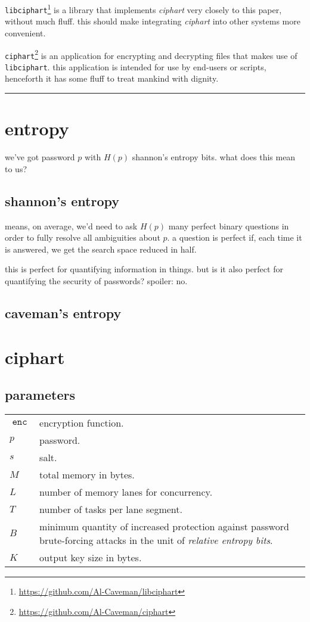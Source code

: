 \documentclass[twocolumn]{article}
\DeclareMathOperator{\enc}{\mathtt{enc}}
\begin{document}
\texttt{libciphart}\footnote{\url{https://github.com/Al-Caveman/libciphart}}
is a library that implements \emph{ciphart} very closely to this paper,
without much fluff.  this should make integrating \emph{ciphart} into other
systems more convenient.

\texttt{ciphart}\footnote{\url{https://github.com/Al-Caveman/ciphart}} is
an application for encrypting and decrypting files that makes use of
\texttt{libciphart}.  this application is intended for use by end-users or
scripts, henceforth it has some fluff to treat mankind with dignity.

\tableofcontents
\noindent
\rule{1\columnwidth}{2pt}

\section{entropy}
we've got password $p$ with $H(p)$ shannon's entropy bits.  what does this
mean to us?

\subsection{shannon's entropy}
means, on average, we'd need to ask $H(p)$ many perfect binary questions in
order to fully resolve all ambiguities about $p$.  a question is perfect
if, each time it is answered, we get the search space reduced in half.

this is perfect for quantifying information in things.  but is it also
perfect for quantifying the security of passwords?  spoiler:  no.

\subsection{caveman's entropy}

\section{ciphart}
\subsection{parameters}
\begin{tabularx}{\columnwidth}{lX}
    $\enc$ & encryption function.\\
    $p$ & password.\\
    $s$ & salt.\\
    $M$ & total memory in bytes.\\
    $L$ & number of memory lanes for concurrency.\\
    $T$ & number of tasks per lane segment.\\
    $B$ & minimum quantity of increased protection against password
            brute-forcing attacks in the unit of \emph{relative entropy
            bits}.\\
    $K$ & output key size in bytes.\\
\end{tabularx}
\end{document}
